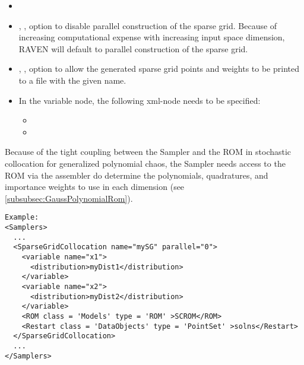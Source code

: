 \begin{itemize}
\itemsep0em
\item \nameDescription
\item {}, , option to disable parallel construction of the sparse grid.  Because of increasing computational expense with increasing input space dimension, RAVEN will default to parallel construction of the sparse grid. %
\item {}, , option to allow the generated sparse grid points and weights to be printed to a file with the given name.
\end{itemize}
\begin{itemize}
\item \variableDescription
 In the variable node, the following xml-node needs to be specified:
 \begin{itemize}
    \item \distributionDescription
    \item \functionDescription
 \end{itemize} \end{itemize}
Because of the tight coupling between the Sampler and the ROM in stochastic collocation for generalized polynomial chaos, the Sampler needs access to the ROM via the assembler do determine the polynomials, quadratures, and importance weights to use in each dimension (see \ref{subsubsec:GaussPolynomialRom}).


\footnotesize
\begin{lstlisting}[style=XML]
Example:
<Samplers>
  ...
  <SparseGridCollocation name="mySG" parallel="0">
    <variable name="x1">
      <distribution>myDist1</distribution>
    </variable>
    <variable name="x2">
      <distribution>myDist2</distribution>
    </variable>
    <ROM class = 'Models' type = 'ROM' >SCROM</ROM>
    <Restart class = 'DataObjects' type = 'PointSet' >solns</Restart>
  </SparseGridCollocation>
  ...
</Samplers>
\end{lstlisting}
 \normalsize

